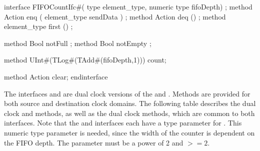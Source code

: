 \begin{libverbatim}
interface FIFOCountIfc#( type element_type, numeric type fifoDepth) ;
   method Action enq ( element_type sendData ) ;
   method Action deq () ;
   method element_type first () ;

   method Bool notFull ;
   method Bool notEmpty ;
   
   method UInt#(TLog#(TAdd#(fifoDepth,1))) count;

   method Action clear;
endinterface 
\end{libverbatim}


The interfaces  and  are dual
clock versions of the  and .
Methods are provided for both source and destination clock domains.
The following
table describes the dual clock   and
 methods, as well as the dual clock  methods, which are common to both interfaces.  
Note that the
 and  interfaces each have a type
parameter  for .  This numeric type parameter is needed, since the width
of the counter is dependent on the FIFO depth.  The 
parameter must be a power of 2 and $>=2$.  

